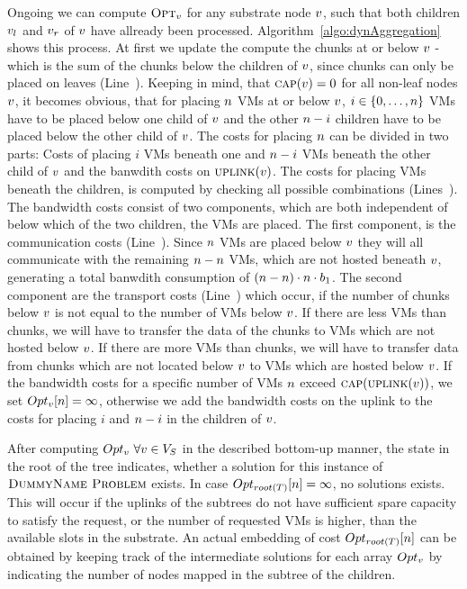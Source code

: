 Ongoing we can compute $\textsc{Opt}_{v}$ for any substrate node 
$v$, such that both children $v_l$ and 
$v_r$ of $v$ have allready been processed. 
Algorithm~\ref{algo:dynAggregation} shows this process. At first we update the 
compute the chunks at or below $v$ - which is the sum of the 
chunks below the children of $v$, since chunks can only be placed 
on leaves (Line~). Keeping in mind, that $\textsc{cap}(v) 
= 0$ for all non-leaf nodes $v$, it becomes obvious, that for 
placing $n$ VMs at or below $v$, $i\in\{0,\dots, 
n\}$ VMs have to be placed below one child of $v$ and the 
other $n - i$ children have to be placed below the other child of 
$v$. The costs for placing $n$ can be divided in two 
parts: Costs of placing $i$ VMs beneath one and $n - i$ VMs beneath the 
other child of $v$ and the banwdith costs on 
$\textsc{uplink}(v)$. The costs for placing VMs beneath the children, is 
computed by checking all possible combinations (Lines~). The 
bandwidth costs consist of two components, which are both independent of below 
which of the two children, the VMs are placed. The first component, is the 
communication costs (Line~). Since $n$ VMs are placed below 
$v$ they will all communicate with the remaining $n - n$ 
VMs, which are not hosted beneath $v$, generating a total banwdith 
consumption of $(n - n)\cdot n \cdot b_1$. The 
second component are the transport costs (Line~) which occur, if 
the number of chunks below $v$ is not equal to the number of VMs 
below $v$. If there are less VMs than chunks, we will have to 
transfer the data of the chunks to VMs which are not hosted below 
$v$. If there are more VMs than chunks, we will have to transfer 
data from chunks which are not located below $v$ to VMs which are 
hosted below $v$. If the bandwidth costs for a specific number of 
VMs $n$ exceed $\textsc{cap}(\textsc{uplink}(v))$, we set 
$Opt_{v}[n] = \infty$, otherwise we add the bandwidth costs 
on the uplink to the costs for placing $i$ and $n - i$ in the children of 
$v$.

After computing $Opt_{v}~\forall 
v \in V_S$ in the described bottom-up manner, the 
state in the root of the tree indicates, whether a solution for this instance 
of $\textsc{DummyName Problem}$ exists. In case $Opt_{root(T)}[n] = \infty$, no solutions 
exists. This will occur if the uplinks of the subtrees do not have sufficient 
spare capacity to satisfy the request, or the number of requested VMs is higher, 
than the available slots in the substrate. An actual embedding of cost 
$Opt_{root(T)}[n]$ can be obtained by keeping track of the intermediate 
solutions for each array $Opt_{v}$ by indicating the number of 
nodes mapped in the subtree of the children.

